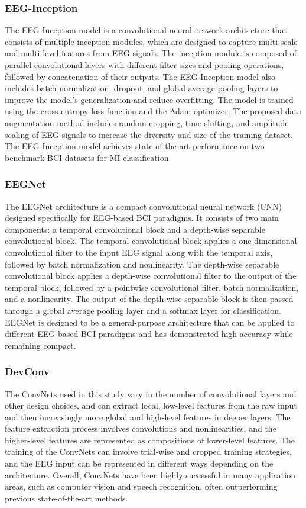 \subsubsection{EEG-Inception}
The EEG-Inception model is a convolutional neural network architecture that consists
of multiple inception modules, which are designed to capture multi-scale and
multi-level features from EEG signals. The inception module is composed of
parallel convolutional layers with different filter sizes and pooling
operations, followed by concatenation of their outputs. The EEG-Inception
model also includes batch normalization, dropout, and global average pooling
layers to improve the model's generalization and reduce overfitting. The model
is trained using the cross-entropy loss function and the Adam optimizer. The
proposed data augmentation method includes random cropping, time-shifting,
and amplitude scaling of EEG signals to increase the diversity and size of
the training dataset. The EEG-Inception model achieves state-of-the-art
performance on two benchmark BCI datasets for MI classification.

\subsubsection{EEGNet}
The EEGNet architecture is a compact convolutional neural network (CNN)
designed specifically for EEG-based BCI paradigms. It consists of two main components:
a temporal convolutional block and a depth-wise separable convolutional
block. The temporal convolutional block applies a one-dimensional
convolutional filter to the input EEG signal along with the temporal axis, followed
by batch normalization and nonlinearity. The depth-wise separable
convolutional block applies a depth-wise convolutional filter to the output
of the temporal block, followed by a pointwise convolutional filter, batch
normalization, and a nonlinearity. The output of the depth-wise separable
block is then passed through a global average pooling layer and a softmax
layer for classification. EEGNet is designed to be a general-purpose architecture
that can be applied to different EEG-based BCI paradigms and has demonstrated high accuracy while remaining compact.
\subsubsection{DevConv}
The ConvNets used in this study vary in the number of convolutional layers and
other design choices, and can extract local, low-level features from the raw
input and then increasingly more global and high-level features in deeper layers.
The feature extraction process involves convolutions and nonlinearities, and
the higher-level features are represented as compositions of lower-level features.
The training of the ConvNets can involve trial-wise and cropped training
strategies, and the EEG input can be represented in different ways depending
on the architecture. Overall, ConvNets have been highly successful in many application
areas, such as computer vision and speech recognition, often outperforming previous
state-of-the-art methods.

